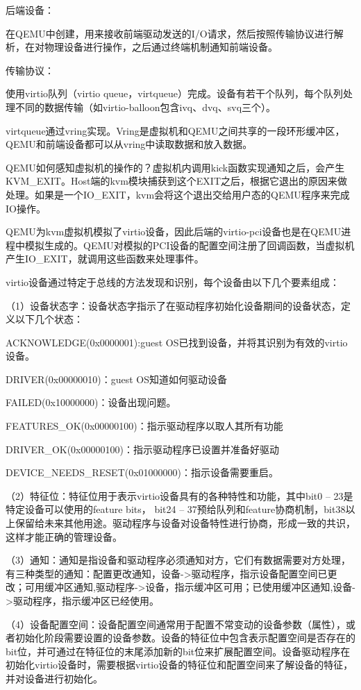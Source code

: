 后端设备：

在QEMU中创建，用来接收前端驱动发送的I/O请求，然后按照传输协议进行解析，在对物理设备进行操作，之后通过终端机制通知前端设备。

传输协议：

使用virtio队列（virtio queue，virtqueue）完成。设备有若干个队列，每个队列处理不同的数据传输（如virtio-balloon包含ivq、dvq、svq三个）。

virtqueue通过vring实现。Vring是虚拟机和QEMU之间共享的一段环形缓冲区，QEMU和前端设备都可以从vring中读取数据和放入数据。

QEMU如何感知虚拟机的操作的？虚拟机内调用kick函数实现通知之后，会产生KVM_EXIT。Host端的kvm模块捕获到这个EXIT之后，根据它退出的原因来做处理。如果是一个IO_EXIT，kvm会将这个退出交给用户态的QEMU程序来完成IO操作。

QEMU为kvm虚拟机模拟了virtio设备，因此后端的virtio-pci设备也是在QEMU进程中模拟生成的。QEMU对模拟的PCI设备的配置空间注册了回调函数，当虚拟机产生IO_EXIT，就调用这些函数来处理事件。

virtio设备通过特定于总线的⽅法发现和识别，每个设备由以下⼏个要素组成：

（1）设备状态字：设备状态字指⽰了在驱动程序初始化设备期间的设备状态，定义以下⼏个状态：

ACKNOWLEDGE(0x0000001):guest OS已找到设备，并将其识别为有效的virtio设备。

DRIVER(0x00000010)：guest OS知道如何驱动设备

FAILED(0x10000000)：设备出现问题。

FEATURES_OK(0x00000100)：指⽰驱动程序以取⼈其所有功能

DRIVER_OK(0x00000100)：指⽰驱动程序已设置并准备好驱动

DEVICE_NEEDS_RESET(0x01000000)：指⽰设备需要重启。

（2）特征位：特征位⽤于表⽰virtio设备具有的各种特性和功能，其中bit0 – 23是特定设备可以使⽤的feature bits， bit24 – 37预给队列和feature协商机制，bit38以上保留给未来其他⽤途。驱动程序与设备对设备特性进⾏协商，形成⼀致的共识，这样才能正确的管理设备。

（3）通知：通知是指设备和驱动程序必须通知对⽅，它们有数据需要对⽅处理，有三种类型的通知：配置更改通知，设备->驱动程序，指⽰设备配置空间已更改；可⽤缓冲区通知,驱动程序->设备，指⽰缓冲区可⽤；已使⽤缓冲区通知,设备->驱动程序，指⽰缓冲区已经使⽤。

（4）设备配置空间：设备配置空间通常⽤于配置不常变动的设备参数（属性），或者初始化阶段需要设置的设备参数。设备的特征位中包含表⽰配置空间是否存在的bit位，并可通过在特征位的末尾添加新的bit位来扩展配置空间。设备驱动程序在初始化virtio设备时，需要根据virtio设备的特征位和配置空间来了解设备的特征，并对设备进⾏初始化。

